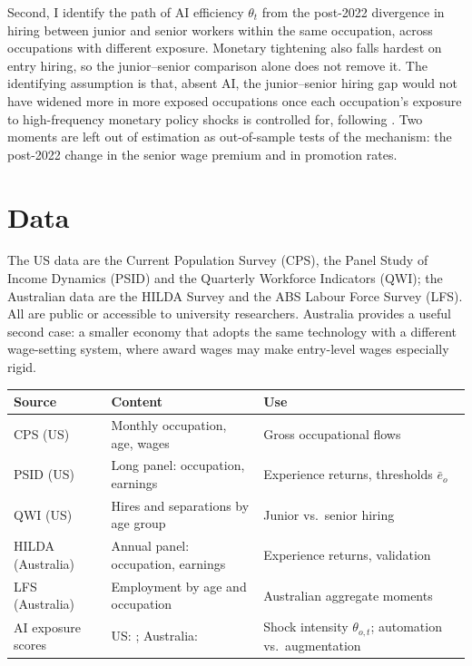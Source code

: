 \documentclass[11pt,a4paper]{article}
\begin{document}
Second, I identify the path of AI efficiency $\theta_t$ from the post-2022 divergence in hiring between junior and senior workers within the same occupation, across occupations with different exposure. Monetary tightening also falls hardest on entry hiring, so the junior--senior comparison alone does not remove it. The identifying assumption is that, absent AI, the junior--senior hiring gap would not have widened more in more exposed occupations once each occupation's exposure to high-frequency monetary policy shocks \citep{jarocinski2020} is controlled for, following \citet{hosseini2026}. Two moments are left out of estimation as out-of-sample tests of the mechanism: the post-2022 change in the senior wage premium and in promotion rates.

\section{Data}

The US data are the Current Population Survey (CPS), the Panel Study of Income Dynamics (PSID) and the Quarterly Workforce Indicators (QWI); the Australian data are the HILDA Survey and the ABS Labour Force Survey (LFS). All are public or accessible to university researchers. Australia provides a useful second case: a smaller economy that adopts the same technology with a different wage-setting system, where award wages may make entry-level wages especially rigid.

\begin{center}
\small
\begin{tabular}{@{}>{\raggedright\arraybackslash}p{3.0cm}>{\raggedright\arraybackslash}p{6.6cm}>{\raggedright\arraybackslash}p{5.5cm}@{}}
\toprule
Source & Content & Use \\
\midrule
CPS (US) & Monthly occupation, age, wages & Gross occupational flows \\
PSID (US) & Long panel: occupation, earnings & Experience returns, thresholds $\bar{e}_o$ \\
QWI (US) & Hires and separations by age group & Junior vs.\ senior hiring \\
HILDA (Australia) & Annual panel: occupation, earnings & Experience returns, validation \\
LFS (Australia) & Employment by age and occupation & Australian aggregate moments \\
AI exposure scores & US: \citet{eloundou2024}; Australia: \citet{jsa2025} & Shock intensity $\theta_{o,t}$; automation vs.\ augmentation \\
\bottomrule
\end{tabular}
\end{center}
\end{document}
